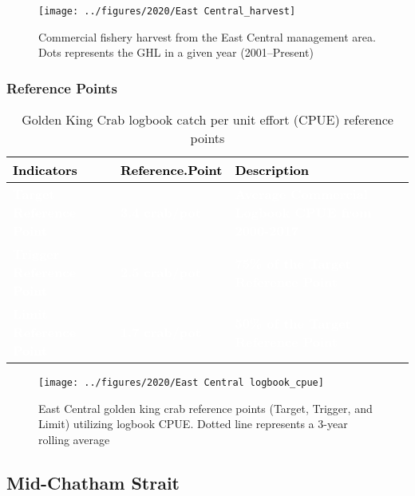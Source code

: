 \documentclass[]{article}
\begin{document}
\begin{figure}[H]
\texttt{[image: ../figures/2020/East Central\_harvest]} \caption{Commercial fishery harvest from the East Central management area. Dots represents the GHL in a given year (2001–Present)}\label{fig:unnamed-chunk-11}
\end{figure}

\subsubsection{Reference Points}\label{reference-points-4}

\begin{table}[!h]

\caption{\label{tab:unnamed-chunk-12}Golden King Crab logbook catch per unit effort (CPUE) reference points}
\centering
\begin{tabular}[t]{l|l|l}
\hline
\textcolor{black}{\textbf{Indicators}} & \textcolor{black}{\textbf{Reference.Point}} & \textcolor{black}{\textbf{Description}}\\
\hline
\rowcolor{gray!6}  \rowcolor{olive}  \textcolor{white}{\textbf{Target Reference Point}} & \textcolor{white}{\textbf{3.4 crab/pot}} & \textcolor{white}{\textbf{Average Commercial Logbook CPUE from 2000-2017}}\\
\hline
\rowcolor{orange}  \textcolor{white}{\textbf{Trigger Reference Point}} & \textcolor{white}{\textbf{2.5 crab/pot}} & \textcolor{white}{\textbf{75\% of the Target Reference Point}}\\
\hline
\rowcolor{gray!6}  \rowcolor{red}  \textcolor{white}{\textbf{Limit Reference Point}} & \textcolor{white}{\textbf{1.7 crab/pot}} & \textcolor{white}{\textbf{50\% of the Target Reference Point}}\\
\hline
\end{tabular}
\end{table}

\begin{figure}[H]
\texttt{[image: ../figures/2020/East Central logbook\_cpue]} \caption{East Central golden king crab reference points (Target, Trigger, and Limit) utilizing logbook CPUE. Dotted line represents a 3-year rolling average}\label{fig:unnamed-chunk-13}
\end{figure}

\subsection{Mid-Chatham Strait}\label{mid-chatham-strait}
\end{document}
